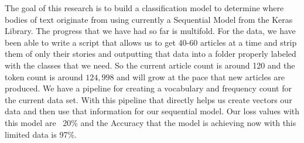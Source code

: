 The goal of this research is to build a classification model to determine where bodies of text originate from using currently a Sequential Model from the Keras Library. 
The progress that we have had so far is multifold. 
For the data, we have been able to write a script that allows us to get 40-60 articles at a time and strip them of only their stories and outputting that data into a folder properly labeled with the classes that we need. 
So the current article count is around 120 and the token count is around $124,998$ and will grow at the pace that new articles are produced. 
We have a pipeline for creating a vocabulary and frequency count for the current data set. With this pipeline that directly helps us create vectors our data and then use that information for our sequential model.
Our loss values with this model are ~20\% and the Accuracy that the model is achieving now with this limited data is 97\%. 
